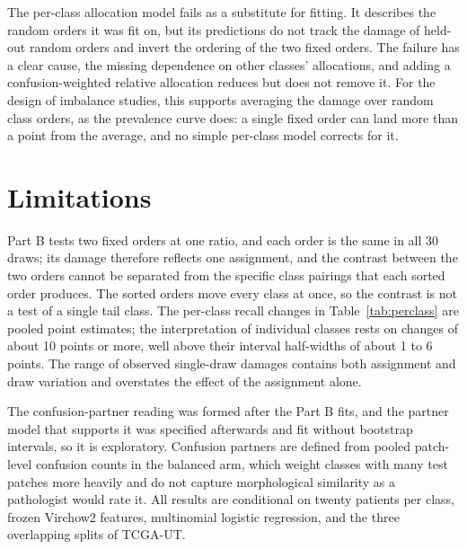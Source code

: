 The per-class allocation model fails as a substitute for fitting. It describes the random orders it was fit on, but its predictions do not track the damage of held-out random orders and invert the ordering of the two fixed orders. The failure has a clear cause, the missing dependence on other classes' allocations, and adding a confusion-weighted relative allocation reduces but does not remove it. For the design of imbalance studies, this supports averaging the damage over random class orders, as the prevalence curve does: a single fixed order can land more than a point from the average, and no simple per-class model corrects for it.

\section{Limitations}
\label{sec:limitations}
Part B tests two fixed orders at one ratio, and each order is the same in all 30 draws; its damage therefore reflects one assignment, and the contrast between the two orders cannot be separated from the specific class pairings that each sorted order produces. The sorted orders move every class at once, so the contrast is not a test of a single tail class. The per-class recall changes in Table~\ref{tab:perclass} are pooled point estimates; the interpretation of individual classes rests on changes of about 10 points or more, well above their interval half-widths of about 1 to 6 points. The range of observed single-draw damages contains both assignment and draw variation and overstates the effect of the assignment alone.

The confusion-partner reading was formed after the Part B fits, and the partner model that supports it was specified afterwards and fit without bootstrap intervals, so it is exploratory. Confusion partners are defined from pooled patch-level confusion counts in the balanced arm, which weight classes with many test patches more heavily and do not capture morphological similarity as a pathologist would rate it. All results are conditional on twenty patients per class, frozen Virchow2 features, multinomial logistic regression, and the three overlapping splits of TCGA-UT.
